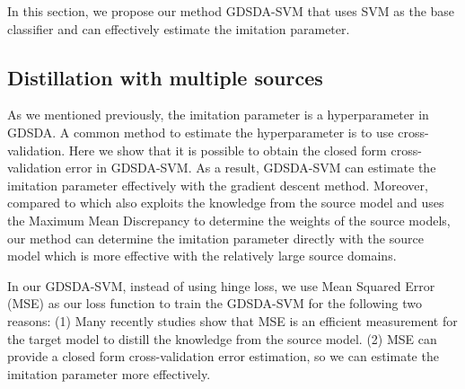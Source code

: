 In this section, we propose our method GDSDA-SVM that uses SVM as the base classifier and can effectively estimate the imitation parameter.
\subsection{Distillation with multiple sources}
As we mentioned previously, the imitation parameter is a hyperparameter in GDSDA. A common method to estimate the hyperparameter is to use cross-validation.
Here we show that it is possible to obtain the closed form cross-validation error\cite{cawley2006leave} in GDSDA-SVM.
As a result,  GDSDA-SVM can estimate the imitation parameter effectively with the gradient descent method. Moreover, compared to \cite{duan2009domain} which also exploits the knowledge from the source model and uses the Maximum Mean Discrepancy to determine the weights of the source models, our method can determine the imitation parameter directly with the source model which is more effective with the relatively large source domains.

In our GDSDA-SVM, instead of using hinge loss, we use Mean Squared Error (MSE) as our loss function to train the GDSDA-SVM for the following two reasons: (1) Many recently studies \cite{ba2014deep,luo2016face,romero2014fitnets,urban2016deep} show that MSE is an efficient measurement for the target model to distill the knowledge from the source model. (2) MSE can provide a closed form cross-validation error estimation, so we can estimate the imitation parameter more effectively. 


